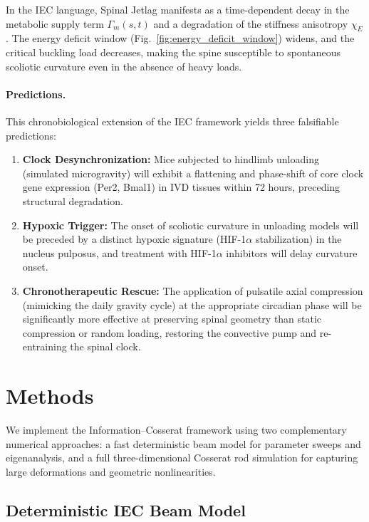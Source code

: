 \documentclass[11pt,a4paper]{article}
\begin{document}
In the IEC language, Spinal Jetlag manifests as a time-dependent decay in the metabolic supply term $\Gamma_m(s, t)$ and a degradation of the stiffness anisotropy $\chi_E$. The energy deficit window (Fig.~\ref{fig:energy_deficit_window}) widens, and the critical buckling load decreases, making the spine susceptible to spontaneous scoliotic curvature even in the absence of heavy loads.

\paragraph{Predictions.}
This chronobiological extension of the IEC framework yields three falsifiable predictions:
\begin{enumerate}
    \item \textbf{Clock Desynchronization:} Mice subjected to hindlimb unloading (simulated microgravity) will exhibit a flattening and phase-shift of core clock gene expression (Per2, Bmal1) in IVD tissues within 72 hours, preceding structural degradation.
    \item \textbf{Hypoxic Trigger:} The onset of scoliotic curvature in unloading models will be preceded by a distinct hypoxic signature (HIF-1$\alpha$ stabilization) in the nucleus pulposus, and treatment with HIF-1$\alpha$ inhibitors will delay curvature onset.
    \item \textbf{Chronotherapeutic Rescue:} The application of pulsatile axial compression (mimicking the daily gravity cycle) at the appropriate circadian phase will be significantly more effective at preserving spinal geometry than static compression or random loading, restoring the convective pump and re-entraining the spinal clock.
\end{enumerate}


\section{Methods}

We implement the Information--Cosserat framework using two complementary numerical approaches: a fast deterministic beam model for parameter sweeps and eigenanalysis, and a full three-dimensional Cosserat rod simulation for capturing large deformations and geometric nonlinearities.

\subsection{Deterministic IEC Beam Model}
\end{document}
